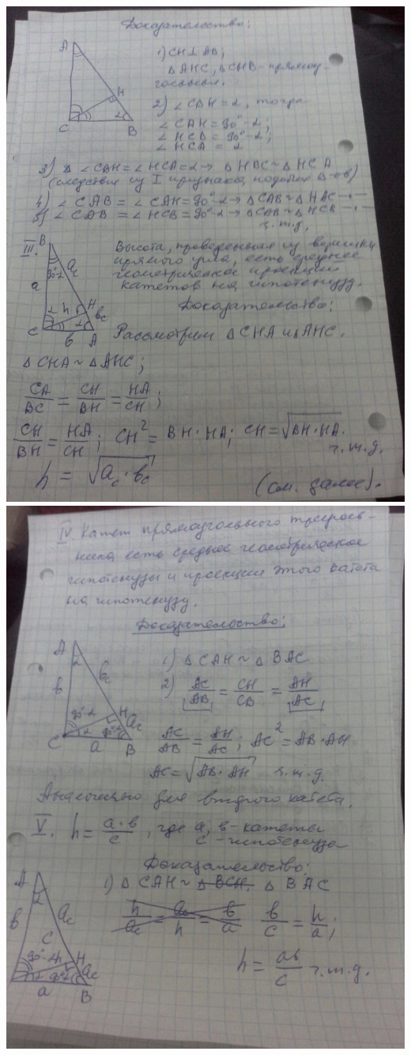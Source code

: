 \documentclass[12pt, letterpaper]{article}
\begin{document}
\includegraphics[scale=0.3]{solve19-1.jpg} \\
\includegraphics[scale=0.3]{solve19-2.jpg} \\
\end{document}
